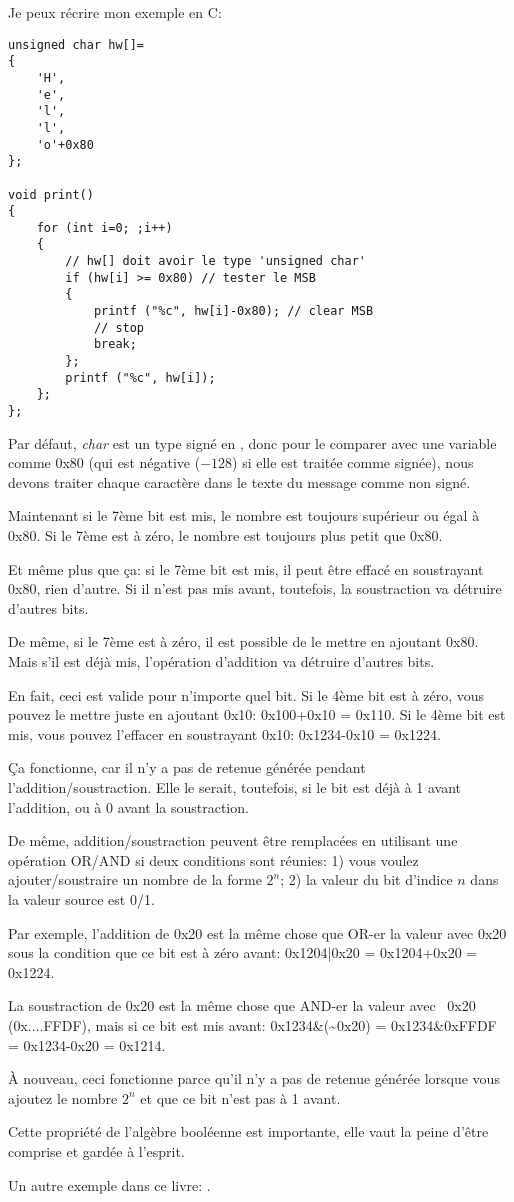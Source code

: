 Je peux récrire mon exemple en C:

\begin{lstlisting}[style=customc]
unsigned char hw[]=
{
	'H',
	'e',
	'l',
	'l',
	'o'+0x80
};

void print()
{
	for (int i=0; ;i++)
	{
		// hw[] doit avoir le type 'unsigned char'
		if (hw[i] >= 0x80) // tester le MSB
		{
			printf ("%c", hw[i]-0x80); // clear MSB
			// stop
			break;
		};
		printf ("%c", hw[i]);
	};
};
\end{lstlisting}

Par défaut, \emph{char} est un type signé en \CCpp, donc pour le comparer avec une
variable comme 0x80 (qui est négative ($-128$) si elle est traitée comme signée),
nous devons traiter chaque caractère dans le texte du message comme non signé.

Maintenant si le 7ème bit est mis, le nombre est toujours supérieur ou égal à
0x80.
Si le 7ème est à zéro, le nombre est toujours plus petit que 0x80.

Et même plus que ça: si le 7ème bit est mis, il peut être effacé en soustrayant 0x80,
rien d'autre.
Si il n'est pas mis avant, toutefois, la soustraction va détruire d'autres bits.

De même, si le 7ème est à zéro, il est possible de le mettre en ajoutant 0x80.
Mais s'il est déjà mis, l'opération d'addition va détruire d'autres bits.

En fait, ceci est valide pour n'importe quel bit.
Si le 4ème bit est à zéro, vous pouvez le mettre juste en ajoutant 0x10: 0x100+0x10 = 0x110.
Si le 4ème bit est mis, vous pouvez l'effacer en soustrayant 0x10: 0x1234-0x10 = 0x1224.

Ça fonctionne, car il n'y a pas de retenue générée pendant l'addition/soustraction.
Elle le serait, toutefois, si le bit est déjà à 1 avant l'addition, ou à 0 avant
la soustraction.

De même, addition/soustraction peuvent être remplacées en utilisant une opération
OR/AND si deux conditions sont réunies:
1) vous voulez ajouter/soustraire un nombre de la forme $2^n$;
2) la valeur du bit d'indice $n$ dans la valeur source est 0/1.

Par exemple, l'addition de 0x20 est la même chose que OR-er la valeur avec 0x20 sous
la condition que ce bit est à zéro avant:
0x1204|0x20 = 0x1204+0x20 = 0x1224.

La soustraction de 0x20 est la même chose que AND-er la valeur avec ~0x20 (0x....FFDF),
mais si ce bit est mis avant:
0x1234\&(\~{}0x20) = 0x1234\&0xFFDF = 0x1234-0x20 = 0x1214.

À nouveau, ceci fonctionne parce qu'il n'y a pas de retenue générée lorsque vous ajoutez
le nombre $2^n$ et que ce bit n'est pas à 1 avant.

Cette propriété de l'algèbre booléenne est importante, elle vaut la peine d'être comprise
et gardée à l'esprit.

Un autre exemple dans ce livre: .

